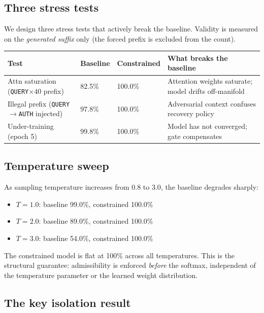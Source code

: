 \documentclass[11pt,a4paper]{article}
\begin{document}
\subsection{Three stress tests}

We design three stress tests that actively break the baseline.
Validity is measured on the \emph{generated suffix} only
(the forced prefix is excluded from the count).

\begin{center}
\renewcommand{\arraystretch}{1.35}
\begin{tabularx}{\linewidth}{p{4.5cm}p{1.8cm}p{2.2cm}X}
\toprule
\textbf{Test} & \textbf{Baseline} & \textbf{Constrained} & \textbf{What breaks the baseline} \\
\midrule
Attn saturation (\texttt{QUERY}$\times 40$ prefix) &
  82.5\% & 100.0\% &
  Attention weights saturate; model drifts off-manifold \\
Illegal prefix (\texttt{QUERY}$\to$\texttt{AUTH} injected) &
  97.8\% & 100.0\% &
  Adversarial context confuses recovery policy \\
Under-training (epoch 5) &
  99.8\% & 100.0\% &
  Model has not converged; gate compensates \\
\bottomrule
\end{tabularx}
\end{center}

\subsection{Temperature sweep}

As sampling temperature increases from $0.8$ to $3.0$,
the baseline degrades sharply:
\begin{itemize}
  \item $T=1.0$: baseline 99.0\%, constrained 100.0\%
  \item $T=2.0$: baseline 89.0\%, constrained 100.0\%
  \item $T=3.0$: baseline 54.0\%, constrained 100.0\%
\end{itemize}
The constrained model is flat at 100\% across all temperatures.
This is the structural guarantee: admissibility is enforced
\emph{before} the softmax, independent of the temperature
parameter or the learned weight distribution.

\subsection{The key isolation result}
\end{document}
